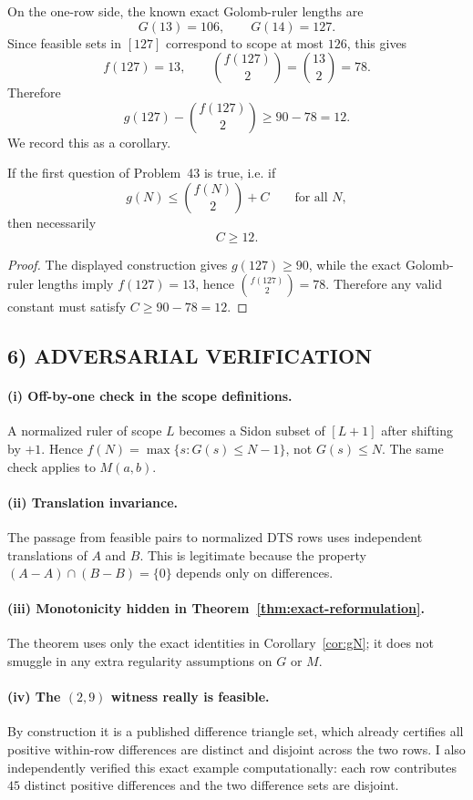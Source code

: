 On the one-row side, the known exact Golomb-ruler lengths are
\[
G(13)=106,\qquad G(14)=127.
\]
Since feasible sets in $[127]$ correspond to scope at most $126$, this gives
\[
f(127)=13,
\qquad
\binom{f(127)}{2}=\binom{13}{2}=78.
\]
Therefore
\[
g(127)-\binom{f(127)}{2}\ge 90-78=12.
\]
We record this as a corollary.

\begin{corollary}
\label{cor:C12}
If the first question of Problem~43 is true, i.e. if
\[
g(N)\le \binom{f(N)}{2}+C
\qquad\text{for all }N,
\]
then necessarily
\[
C\ge 12.
\]
\end{corollary}

\begin{proof}
The displayed construction gives $g(127)\ge 90$, while the exact Golomb-ruler lengths imply $f(127)=13$, hence $\binom{f(127)}2=78$. Therefore any valid constant must satisfy $C\ge 90-78=12$.
\end{proof}

\subsection{6) ADVERSARIAL VERIFICATION}

\paragraph{(i) Off-by-one check in the scope definitions.}
A normalized ruler of scope $L$ becomes a Sidon subset of $[L+1]$ after shifting by $+1$. Hence $f(N)=\max\{s:G(s)\le N-1\}$, not $G(s)\le N$. The same check applies to $M(a,b)$.

\paragraph{(ii) Translation invariance.}
The passage from feasible pairs to normalized DTS rows uses independent translations of $A$ and $B$. This is legitimate because the property $(A-A)\cap(B-B)=\{0\}$ depends only on differences.

\paragraph{(iii) Monotonicity hidden in Theorem~\ref{thm:exact-reformulation}.}
The theorem uses only the exact identities in Corollary~\ref{cor:gN}; it does not smuggle in any extra regularity assumptions on $G$ or $M$.

\paragraph{(iv) The $(2,9)$ witness really is feasible.}
By construction it is a published difference triangle set, which already certifies all positive within-row differences are distinct and disjoint across the two rows. I also independently verified this exact example computationally: each row contributes $45$ distinct positive differences and the two difference sets are disjoint.


